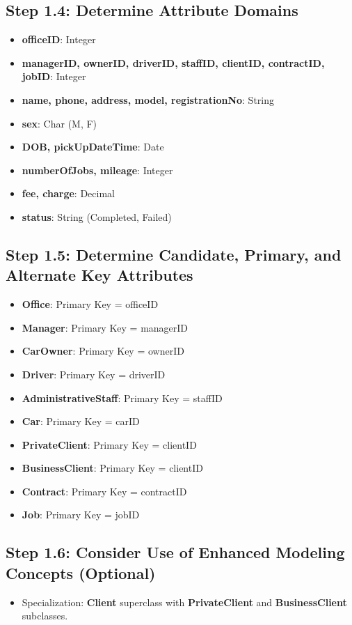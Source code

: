 \documentclass[a4paper,12pt]{article}
\begin{document}
\subsection*{Step 1.4: Determine Attribute Domains}
\begin{itemize}
    \item \textbf{officeID}: Integer
    \item \textbf{managerID, ownerID, driverID, staffID, clientID, contractID, jobID}: Integer
    \item \textbf{name, phone, address, model, registrationNo}: String
    \item \textbf{sex}: Char (M, F)
    \item \textbf{DOB, pickUpDateTime}: Date
    \item \textbf{numberOfJobs, mileage}: Integer
    \item \textbf{fee, charge}: Decimal
    \item \textbf{status}: String (Completed, Failed)
\end{itemize}

\subsection*{Step 1.5: Determine Candidate, Primary, and Alternate Key Attributes}
\begin{itemize}
    \item \textbf{Office}: Primary Key = officeID
    \item \textbf{Manager}: Primary Key = managerID
    \item \textbf{CarOwner}: Primary Key = ownerID
    \item \textbf{Driver}: Primary Key = driverID
    \item \textbf{AdministrativeStaff}: Primary Key = staffID
    \item \textbf{Car}: Primary Key = carID
    \item \textbf{PrivateClient}: Primary Key = clientID
    \item \textbf{BusinessClient}: Primary Key = clientID
    \item \textbf{Contract}: Primary Key = contractID
    \item \textbf{Job}: Primary Key = jobID
\end{itemize}

\subsection*{Step 1.6: Consider Use of Enhanced Modeling Concepts (Optional)}
\begin{itemize}
    \item Specialization: \textbf{Client} superclass with \textbf{PrivateClient} and \textbf{BusinessClient} subclasses.
\end{itemize}
\end{document}
